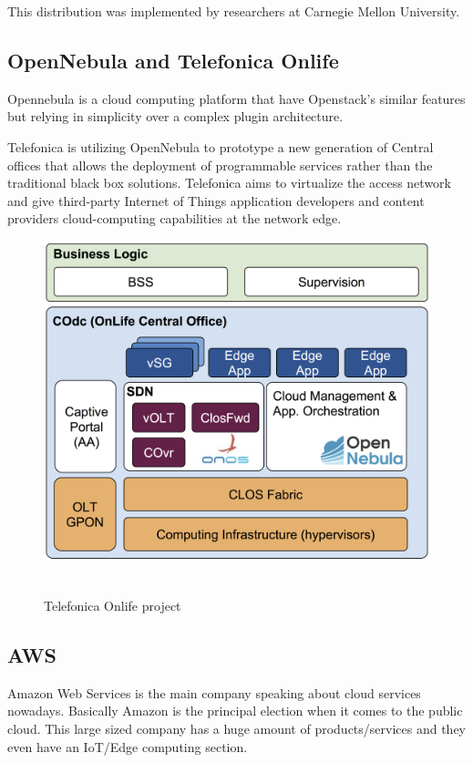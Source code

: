 This distribution was implemented by researchers at Carnegie Mellon University.
\newpage
\subsection{OpenNebula and Telefonica Onlife}
\label{makereference2.3.2}

Opennebula is a cloud computing platform that have Openstack's similar features but relying in simplicity over a complex plugin architecture.

Telefonica is utilizing OpenNebula to prototype a new generation of Central offices that allows the deployment of programmable services rather than the traditional black box solutions. Telefonica aims to virtualize the access network and give third-party Internet of Things application developers and content providers cloud-computing capabilities at the network edge.~\cite{IEC:Opennebula:2017}

\begin{figure}[h]%
    \includegraphics[width=6.5in]{figures/opennebula_edge.png}
~\caption{Telefonica Onlife project}
\label{figure2.3}
\end{figure}

\newpage
\subsection{AWS}
\label{makereference2.3.3}

Amazon Web Services is the main company speaking about cloud services nowadays. Basically Amazon is the principal election when it comes to the public cloud.
This large sized company has a huge amount of products/services and they even have an IoT/Edge computing section.

